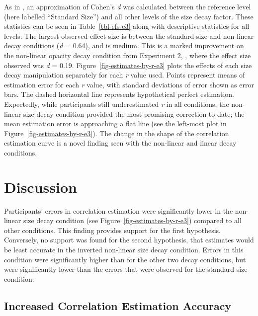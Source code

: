 \documentclass[../main.tex]{subfiles}
\begin{document}
As in , an approximation of Cohen's
\emph{d} was calculated between the reference level (here labelled
``Standard Size'') and all other levels of the size decay factor. These
statistics can be seen in Table~\ref{tbl-efs-e3} along with descriptive
statistics for all levels. The largest observed effect size is between
the standard size and non-linear decay conditions (\emph{d} = 0.64), and
is medium. This is a marked improvement on the non-linear opacity decay
condition from Experiment 2, , where the
effect size observed was \emph{d} = 0.19.
Figure~\ref{fig-estimates-by-r-e3} plots the effects of each size decay
manipulation separately for each \emph{r} value used. Points represent
means of estimation error for each \emph{r} value, with standard
deviations of error shown as error bars. The dashed horizontal line
represents hypothetical perfect estimation. Expectedly, while
participants still underestimated \emph{r} in all conditions, the
non-linear size decay condition provided the most promising correction
to date; the mean estimation error is approaching a flat line (see the
left-most plot in Figure~\ref{fig-estimates-by-r-e3}). The change in the
shape of the correlation estimation curve is a novel finding seen with
the non-linear and linear decay conditions.

\section{Discussion}\label{discussion-e3}

Participants' errors in correlation estimation were significantly lower
in the non-linear size decay condition (see
Figure~\ref{fig-estimates-by-r-e3}) compared to all other conditions.
This finding provides support for the first hypothesis. Conversely, no
support was found for the second hypothesis, that estimates would be
least accurate in the inverted non-linear size decay condition. Errors
in this condition were significantly higher than for the other two decay
conditions, but were significantly lower than the errors that were
observed for the standard size condition.

\subsection{Increased Correlation Estimation
Accuracy}\label{increased-correlation-estimation-accuracy}
\end{document}
